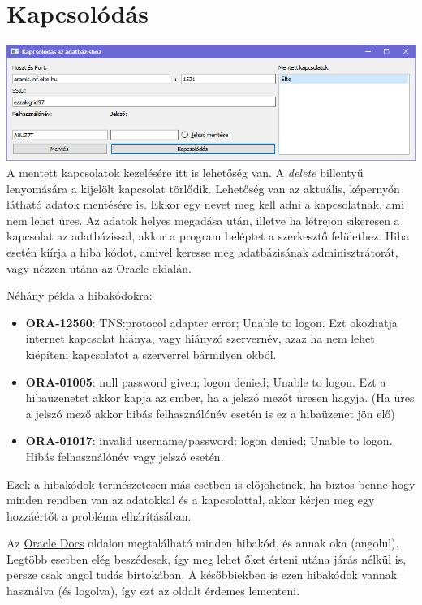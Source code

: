 \documentclass{elteikthesis}
\begin{document}
\section{Kapcsolódás}
\includegraphics[width=1.0\textwidth]{Connect}
A mentett kapcsolatok kezelésére itt is lehetőség van. A \textit{delete} billentyű lenyomására a kijelölt kapcsolat törlődik.
Lehetőség van az aktuális, képernyőn látható adatok mentésére is. Ekkor egy nevet meg kell adni a kapcsolatnak, ami nem lehet üres.
Az adatok helyes megadása után, illetve ha létrejön sikeresen a kapcsolat az adatbázissal, akkor a program beléptet a szerkesztő felülethez.
Hiba esetén kiírja a hiba kódot, amivel keresse meg adatbázisának adminisztrátorát, vagy nézzen utána az Oracle oldalán.

Néhány példa a hibakódokra:
\begin{itemize}
  \item \textbf{ORA-12560}: TNS:protocol adapter error; Unable to logon. Ezt okozhatja internet kapcsolat hiánya,
  vagy hiányzó szervernév, azaz ha nem lehet kiépíteni kapcsolatot a szerverrel bármilyen okból.
  \item \textbf{ORA-01005}: null password given; logon denied; Unable to logon. Ezt a hibaüzenetet akkor kapja az ember,
  ha a jelszó mezőt üresen hagyja. (Ha üres a jelszó mező akkor hibás felhasználónév esetén is ez a hibaüzenet jön elő)
  \item \textbf{ORA-01017}: invalid username/password; logon denied; Unable to logon. Hibás felhasználónév vagy jelszó esetén.
\end{itemize}

Ezek a hibakódok természetesen más esetben is előjöhetnek, ha biztos benne hogy minden rendben van az adatokkal és a
kapcsolattal, akkor kérjen meg egy hozzáértőt a probléma elhárításában.

Az \href{https://docs.oracle.com/cd/B28359_01/server.111/b28278/toc.htm}{Oracle Docs} oldalon megtalálható minden hibakód, és annak oka (angolul). Legtöbb esetben elég beszédesek, így meg lehet őket érteni utána járás nélkül is,
persze csak angol tudás birtokában. A későbbiekben is ezen hibakódok vannak használva (és logolva), így ezt az oldalt érdemes lementeni.
\end{document}
